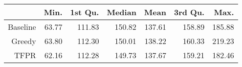 \begin{table}[ht]
\centering
\begin{tabular}{rrrrrrr}
  \hline
 & Min. & 1st Qu. & Median & Mean & 3rd Qu. & Max. \\ 
  \hline
Baseline & 63.77 & 111.83 & 150.82 & 137.61 & 158.89 & 185.88 \\ 
  Greedy & 63.80 & 112.30 & 150.01 & 138.22 & 160.33 & 219.23 \\ 
  TFPR & 62.16 & 112.28 & 149.73 & 137.67 & 159.21 & 182.46 \\ 
   \hline
\end{tabular}
\end{table}
